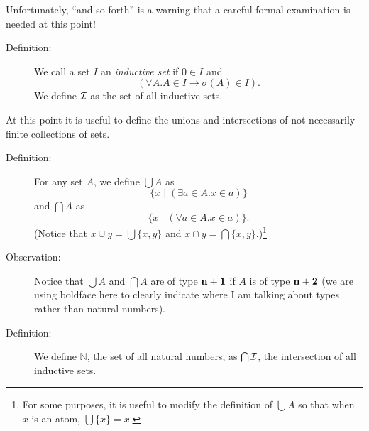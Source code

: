 \documentclass[12pt]{book}
\begin{document}
Unfortunately, ``and so forth'' is a warning that a careful formal
examination is needed at this point!

\begin{description}

\item[Definition:] We call a set $I$ an {\em inductive set\/} if $0
\in I$ and $$(\forall A.A \in I \rightarrow \sigma(A) \in I).$$  We define
$\cal I$ as the set of all inductive sets.

\end{description}

At this point it is useful to define the unions and intersections of
not necessarily finite collections of sets.  

\begin{description}

\item[Definition:]  For any set $A$, we
define $\bigcup A$ as $$\{x \mid (\exists a \in A.x \in a)\}$$ and
$\bigcap A$ as $$\{x \mid (\forall a \in A.x \in a)\}.$$  (Notice that $x
\cup y = \bigcup \{x,y\}$ and $x \cap y = \bigcap\{x,y\}$.)\footnote{For some purposes, it is useful to modify the definition of $\bigcup A$ so that
when $x$ is an atom, $\bigcup \{x\} = x$.}

\item[Observation:] Notice that $\bigcup A$ and $\bigcap A$ are of
type ${\bf n+1}$ if $A$ is of type ${\bf n+2}$ (we are using boldface here to clearly indicate where I am talking about types rather than natural numbers).

\item[Definition:]  We define ${\mathbb N}$, the set of all natural numbers, as $\bigcap
{\cal I}$, the intersection of all inductive sets.

\end{description}
\end{document}
